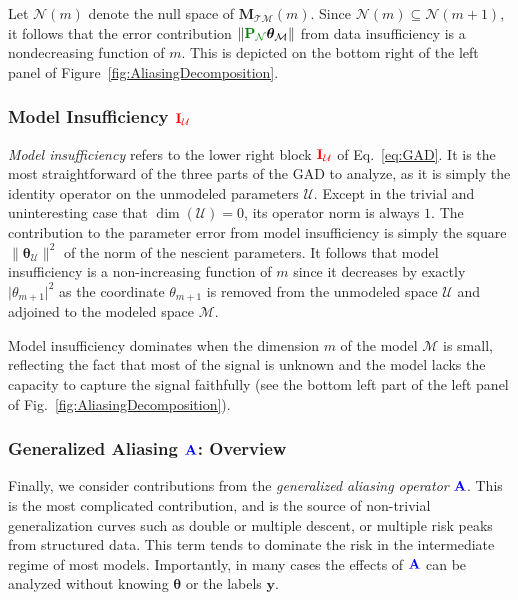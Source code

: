 \documentclass[twocolumn,aps,prx,superscriptaddress,10pt]{revtex4-2}
\newcommand{\by}{\bm{y}}
\newcommand{\y}{\by}  %
\newcommand{\0}{\bm{0}}
\newcommand{\btheta}{\boldsymbol{\theta}}
\newcommand{\M}{\mathcal{M}} %
\newcommand{\K}{\mathcal{N}} %
\newcommand{\T}{\mathcal{T}} %
\newcommand{\U}{\mathcal{U}} %
\newcommand{\bbA}{{\color{blue}{\mathbf{A}}}}  %
\newcommand{\bbIU}{{\color{red}{\bbI_{\U}}}}  %
\newcommand{\bbPN}{{\color{Green}{\mathbf{P}_{\K}}}} %
\newcommand{\bbI}{\mathbf{I}}
\newcommand{\bbM}{\mathbf{M}}
\newcommand{\MTM}{\bbM_{\T\M}}
\begin{document}
Let $\K(m)$ denote the null space of $\MTM(m)$. Since $\K(m) \subseteq \K(m+1)$, it follows that the error contribution $\| \bbPN \btheta_\M\|$ from data insufficiency is a nondecreasing function of $m$. This is depicted on the bottom right of the left panel of Figure~\ref{fig:AliasingDecomposition}.

\subsubsection{Model Insufficiency  \texorpdfstring{$\bbIU$}{IU}}\label{sec:model_insufficiency}

\emph{Model insufficiency} refers to the lower right block $\bbIU$ of Eq.~\eqref{eq:GAD}.
It is the most straightforward of the three parts of the GAD to analyze, as it is simply the identity operator on the unmodeled parameters $\U$.
Except in the trivial and uninteresting case that $\dim (\U) = 0$, its operator norm is always $1$.  The contribution to the parameter error from model insufficiency is
simply the square $\| \btheta_\U \|^2$ of the norm of the nescient parameters.  It follows that model insufficiency is a non-increasing function of $m$ since it decreases by exactly $\vert \theta_{m+1} \vert^2$ as the coordinate $\theta_{m+1}$ is removed from the unmodeled space $\U$ and adjoined to the modeled space $\M$.

Model insufficiency dominates when the dimension $m$ of the model $\M$ is small, reflecting the fact that most of the signal is unknown and the model lacks the capacity to capture the signal faithfully (see the bottom left part of the left panel of Fig.~\ref{fig:AliasingDecomposition}).

\subsubsection{Generalized Aliasing  \texorpdfstring{$\bbA$}{A}: Overview}\label{sec:GAD_overview}

Finally, we consider contributions from the \emph{generalized aliasing operator} $\bbA$.
This is the most complicated contribution, and is the source of non-trivial generalization curves such as double or multiple descent, or multiple risk peaks from structured data.  This term tends to dominate the risk in the intermediate regime of most models.  Importantly, in many cases the effects of $\bbA$ can be analyzed without knowing $\btheta$ or the labels $\y$. 
\end{document}
